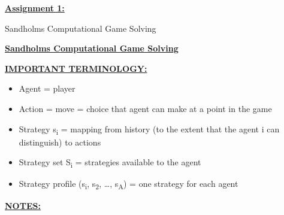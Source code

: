 \documentclass[
]{article}
\begin{document}
\textbf{\ul{Assignment 1:}}

Sandholm\textquotesingle s Computational Game Solving

\textbf{\ul{Sandholm\textquotesingle s Computational Game Solving}}

\textbf{\ul{IMPORTANT TERMINOLOGY:}}

\begin{itemize}
\item
  Agent = player
\item
  Action = move = choice that agent can make at a point in the game
\item
  Strategy s\textsubscript{i} = mapping from history (to the extent that
  the agent i can distinguish) to actions
\item
  Strategy set S\textsubscript{i} = strategies available to the agent
\item
  Strategy profile (s\textsubscript{i}, s\textsubscript{2}, \ldots,
  s\textsubscript{\textbar A\textbar{}}) = one strategy for each agent
\end{itemize}

\textbf{\ul{NOTES:}}
\end{document}
